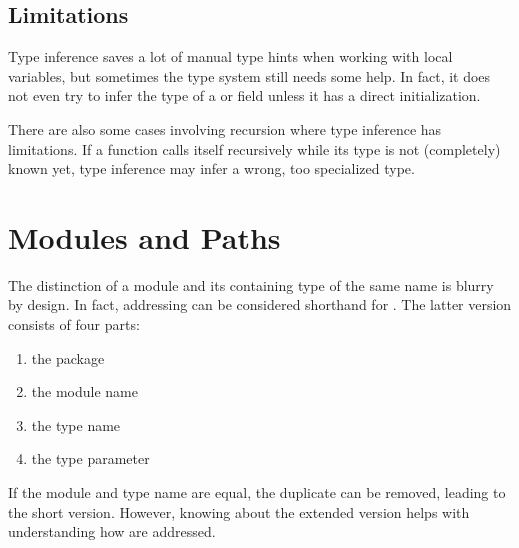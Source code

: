 \documentclass{haxe}
\begin{document}


\subsection{Limitations}
\label{type-system-inference-limitations}

Type inference saves a lot of manual type hints when working with local variables, but sometimes the type system still needs some help. In fact, it does not even try to infer the type of a  or  field unless it has a direct initialization.

There are also some cases involving recursion where type inference has limitations. If a function calls itself recursively while its type is not (completely) known yet, type inference may infer a wrong, too specialized type.




\section{Modules and Paths}
\label{type-system-modules-and-paths}


The distinction of a module and its containing type of the same name is blurry by design. In fact, addressing  can be considered shorthand for . The latter version consists of four parts:

\begin{enumerate}
	\item the package 
	\item the module name 
	\item the type name 
	\item the type parameter 
\end{enumerate}
If the module and type name are equal, the duplicate can be removed, leading to the  short version. However, knowing about the extended version helps with understanding how  are addressed.
\end{document}
